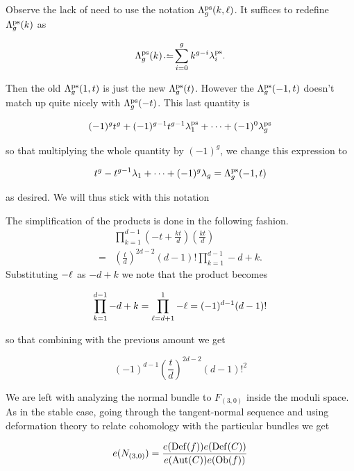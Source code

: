 \documentclass[12pt]{memoir}
\begin{document}
\begin{Rmk}
    Observe the lack of need to use the notation \(\Lambda_g^{\operatorname{\mathrm{ps}}}(k,\ell)\). It suffices to redefine \(\Lambda_g^{\operatorname{\mathrm{ps}}}(k)\) as

    \[\La_g^{\ps}(k)\defeq\sum_{i=0}^{g}k^{g-i}\la_i^{\ps}.\]

    Then the old \(\Lambda_g^{\operatorname{\mathrm{ps}}}(1,t)\) is just the new \(\Lambda_g^{\operatorname{\mathrm{ps}}}(t)\). However the \(\Lambda_g^{\operatorname{\mathrm{ps}}}(-1,t)\) doesn't match up quite nicely with \(\Lambda_g^{\operatorname{\mathrm{ps}}}(-t)\). This last quantity is

    \[(-1)^gt^g+(-1)^{g-1}t^{g-1}\lambda_1^{\operatorname{\mathrm{ps}}}+\dots+(-1)^0\lambda_g^{\operatorname{\mathrm{ps}}}\]

    so that multiplying the whole quantity by \((-1)^g\), we change this expression to

    \[t^{g}-t^{g-1}\lambda_1+\dots+(-1)^g\lambda_g=\Lambda_g^{\operatorname{\mathrm{ps}}}(-1,t)\]

    as desired. We will thus stick with this notation

\end{Rmk}
\begin{ptcb}
    The simplification of the products is done in the following fashion.
    \begin{align*}
          & \prod_{k=1}^{d-1}\left(-t+\frac{kt}{d}\right)\left(\frac{kt}{d}\right) \\
        = & \left(\frac{t}{d}\right)^{2d-2}(d-1)!\prod_{k=1}^{d-1}-d+k.
    \end{align*}
    Substituting \(-\ell\) as \(-d+k\) we note that the product becomes

    \[\prod_{k=1}^{d-1}-d+k=\prod_{\ell=d+1}^{1}-\ell=(-1)^{d-1}(d-1)!\]

    so that combining with the previous amount we get

    \[(-1)^{d-1}\left(\frac{t}{d}\right)^{2d-2}(d-1)!^2\]

\end{ptcb}

We are left with analyzing the normal bundle to \(F_{(3,0)}\) inside the moduli space. As in the stable case, going through the tangent-normal sequence and using deformation theory to relate cohomology with the particular bundles we get

\[e(N_{(3,0)})=\frac{e(\operatorname{Def}(f))e(\operatorname{Def}(C))}{e(\operatorname{Aut}(C))e(\operatorname{Ob}(f))}\]
\end{document}
